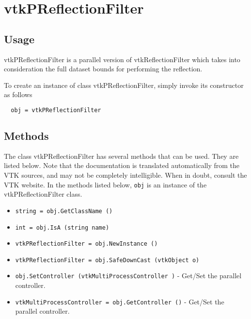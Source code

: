 \section{vtkPReflectionFilter}

\subsection{Usage}

 vtkPReflectionFilter is a parallel version of vtkReflectionFilter which takes
 into consideration the full dataset bounds for performing the reflection.

To create an instance of class vtkPReflectionFilter, simply
invoke its constructor as follows
\begin{verbatim}
  obj = vtkPReflectionFilter
\end{verbatim}
\subsection{Methods}

The class vtkPReflectionFilter has several methods that can be used.
  They are listed below.
Note that the documentation is translated automatically from the VTK sources,
and may not be completely intelligible.  When in doubt, consult the VTK website.
In the methods listed below, \verb|obj| is an instance of the vtkPReflectionFilter class.
\begin{itemize}
\item  \verb|string = obj.GetClassName ()|

\item  \verb|int = obj.IsA (string name)|

\item  \verb|vtkPReflectionFilter = obj.NewInstance ()|

\item  \verb|vtkPReflectionFilter = obj.SafeDownCast (vtkObject o)|

\item  \verb|obj.SetController (vtkMultiProcessController )| -  Get/Set the parallel controller.

\item  \verb|vtkMultiProcessController = obj.GetController ()| -  Get/Set the parallel controller.

\end{itemize}
